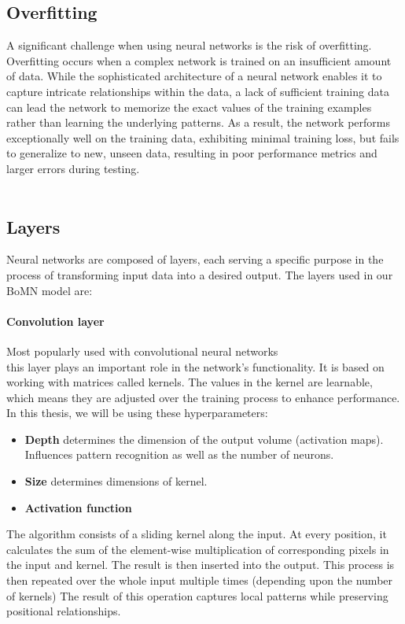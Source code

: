 \subsection{Overfitting}
A significant challenge when using neural networks is the risk of overfitting. Overfitting occurs when a complex network is trained on an insufficient amount of data. While the sophisticated architecture of a neural network enables it to capture intricate relationships within the data, a lack of sufficient training data can lead the network to memorize the exact values of the training examples rather than learning the underlying patterns. As a result, the network performs exceptionally well on the training data, exhibiting minimal training loss, but fails to generalize to new, unseen data, resulting in poor performance metrics and larger errors during testing.
\\\\

\subsection{Layers}
Neural networks are composed of layers, each serving a specific purpose in the process of transforming input data into a desired output.  The layers used in our BoMN model are:

\paragraph{Convolution layer}
Most popularly used with convolutional neural networks\\\cite{convolutional} this layer plays an important role in the network's functionality. It is based on working with matrices called kernels.  The values in the kernel are learnable, which means they are adjusted over the training process to enhance performance. In this thesis, we will be using these hyperparameters:
\begin{itemize}
	\item \textbf{Depth} determines the dimension of the output volume (activation maps). Influences pattern recognition as well as the number of neurons.
	\item \textbf{Size} determines dimensions of kernel.
	\item \textbf{Activation function}
\end{itemize}
The algorithm consists of a sliding kernel along the input. At every position, it calculates the sum of the element-wise multiplication of corresponding pixels in the input and kernel. The result is then inserted into the output. This process is then repeated over the whole input multiple times (depending upon the number of kernels) %
The result of this operation captures local patterns while preserving positional relationships.


